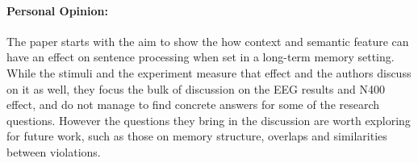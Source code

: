 \documentclass[12pt]{report}
\begin{document}
\paragraph{Personal Opinion:} 
The paper starts with the aim to show the how context and semantic feature can have an effect on sentence processing when set in a long-term memory setting. While the stimuli and the experiment measure that effect and the authors discuss on it as well, they focus the bulk of discussion on the EEG results and N400 effect, and do not manage to find concrete answers for some of the research questions. However the questions they bring in the discussion are worth exploring for future work, such as those on memory structure, overlaps and similarities between violations.
\vfill
\end{document}
